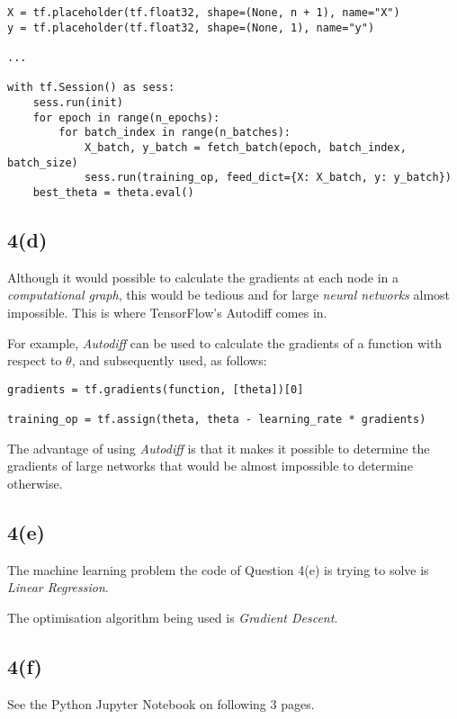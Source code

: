 \documentclass[12pt, a4paper,reqno]{article}
\begin{document}
\begin{verbatim}
X = tf.placeholder(tf.float32, shape=(None, n + 1), name="X")
y = tf.placeholder(tf.float32, shape=(None, 1), name="y")

...

with tf.Session() as sess:
    sess.run(init)
    for epoch in range(n_epochs):
        for batch_index in range(n_batches):
            X_batch, y_batch = fetch_batch(epoch, batch_index, batch_size)
            sess.run(training_op, feed_dict={X: X_batch, y: y_batch})
    best_theta = theta.eval()
\end{verbatim}

\subsection*{4(d)}
Although it would possible to calculate the gradients at each node in a \emph{computational graph}, this would be tedious and for large \emph{neural networks} almost impossible. This is where TensorFlow's {Autodiff} comes in.

For example, \emph{Autodiff} can be used to calculate the gradients of a function with respect to $\theta$, and subsequently used, as follows: 

\begin{verbatim}
gradients = tf.gradients(function, [theta])[0]

training_op = tf.assign(theta, theta - learning_rate * gradients)
\end{verbatim}

The advantage of using \emph{Autodiff} is that it makes it possible to determine the gradients of large networks that would be almost impossible to determine otherwise.

\subsection*{4(e)}
The machine learning problem the code of Question 4(e) is trying to solve is \emph{Linear Regression}.

The optimisation algorithm being used is \emph{Gradient Descent}.

\subsection*{4(f)}
See the Python Jupyter Notebook on following 3 pages.

\end{document}
